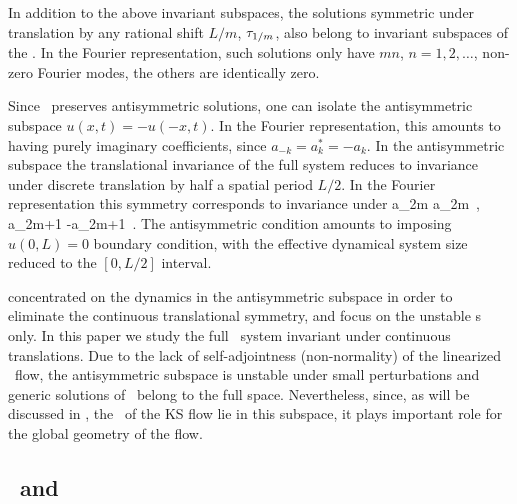 In addition to the above invariant subspaces, the solutions
symmetric under translation by any rational shift $L/m$,
$\tau_{1/m}$, also belong to invariant subspaces of the \KSe . In
the Fourier representation, such solutions only have $mn$, $n =
1,2,\ldots$, non-zero Fourier modes, the others are identically
zero.


Since \KSe\ preserves antisymmetric solutions, one can isolate the
antisymmetric subspace $u(x,t)=-u(-x,t)$.  In the Fourier
representation, this amounts to having purely imaginary
coefficients, since $a_{-k}= a^\ast_k = -a_k$. In the antisymmetric
subspace the translational invariance of the full system reduces to
invariance under discrete translation  by half a
spatial period $L/2$. In the Fourier representation 
this symmetry corresponds to invariance under
\beq
a_{2m} \to a_{2m}
    \,,\qquad
a_{2m+1} \to -a_{2m+1}
\,.
The antisymmetric condition amounts to imposing
$u(0,L)=0$ boundary condition, with the effective dynamical system
size reduced to the $[0, L/2]$ interval.

 concentrated on the dynamics in
the antisymmetric subspace in order to eliminate the continuous
translational symmetry, and focus on the unstable \po s only. In
this paper we study the full \KS\ system invariant under continuous
translations. Due to the lack of self-adjointness (non-normality) of
the linearized \KS\ flow, the antisymmetric subspace is unstable
under small perturbations and generic solutions of \KSe\ belong to
the full space. Nevertheless, since, as will be discussed in
, the \eqva\ of the KS flow
lie in this subspace, it plays important role for the global
geometry of the flow.

\subsection{\Eqva\ and \reqva} %
\label{sec:stks}


